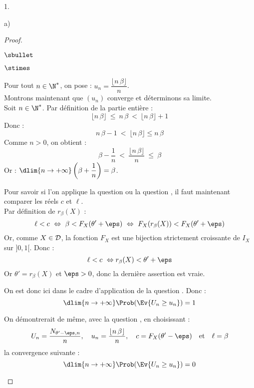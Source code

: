\documentclass[11pt]{article}%
\begin{document}
\begin{noliste}{1.}
\begin{noliste}{a)}
\begin{proof}
\begin{noliste}{$\sbullet$}
\begin{noliste}{$\stimes$}
	  
	  
	  
	  
	  
	  \item Pour tout $n\in \N^*$, on pose : $u_n = 
	  \dfrac{\lfloor n\, \beta \rfloor}{n}$.\\
	  Montrons maintenant que $(u_n)$ converge 
	  et déterminons sa limite.\\
	  Soit $n\in\N^*$. Par définition de la partie entière :
	  \[
	    \lfloor n\, \beta \rfloor \ \leq \ n\, \beta \
	    < \ \lfloor n\, \beta \rfloor +1
	  \]
	  Donc :
	  \[
	    n\, \beta -1 \ < \ \lfloor n\, \beta \rfloor \leq n\, \beta
	  \]
	  Comme $n>0$, on obtient :
	  \[
	    \beta - \dfrac{1}{n} \ < \ \dfrac{\lfloor n\, \beta 
	    \rfloor}{n} \ \leq \ \beta
	  \]
	  Or : $\dlim{n\to +\infty} \left(\beta + \dfrac{1}{n} \right)
	  = \beta$.
	  
	  \item Pour savoir si l'on applique la question 
	  ou la question , il faut maintenant comparer les 
	  réels $c$ et $\ell$.\\
	  Par définition de $r_\beta(X)$ :
	  \[
	    \ell < c \ \Leftrightarrow \ \beta < F_X(\theta' +\eps)
	    \ \Leftrightarrow \ F_X(r_\beta(X)) < F_X(\theta' +\eps)
	  \]
	  Or, comme $X\in {\cal D}$, la fonction $F_X$ est une 
	  bijection strictement croissante de $I_X$ sur $]0,1[$. Donc :
	  \[
	    \ell < c \ \Leftrightarrow r_\beta(X) < \theta'+\eps
	  \]
	  Or $\theta'=r_\beta(X)$ et $\eps >0$, donc la dernière 
	  assertion est vraie.
	  
	  \item On est donc ici dans le cadre d'application de la 
	question . Donc :
	\[
	  \dlim{n\to +\infty} \Prob(\Ev{U_n \geq u_n})=1
	\]
	
	\item On démontrerait de même, avec la question , en 
	choisissant :
	\[
	  U_n = \dfrac{N_{\theta'-\eps,n}}{n}, \quad u_n = 
	  \dfrac{\lfloor n \, \beta \rfloor}{n}, \quad c = F_X(\theta'
	  -\eps) \quad \text{et} \quad \ell = \beta
	\]
	la convergence suivante :
	\[
	  \dlim{n\to +\infty} \Prob(\Ev{U_n \geq u_n})=0
	\]
	\end{noliste}
	

\end{noliste}
\end{proof}
\end{noliste}
\end{noliste}
\end{document}
